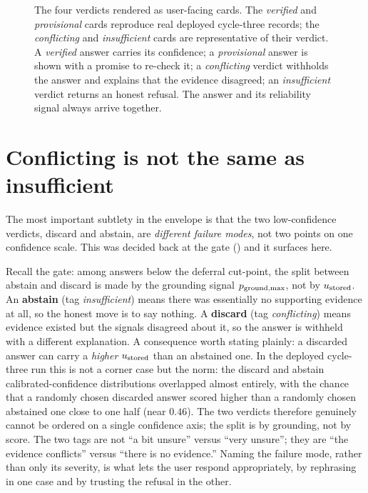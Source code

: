 \begin{figure}[htbp]
\caption[What the user actually sees]{The four verdicts rendered as user-facing cards. The
\emph{verified} and \emph{provisional} cards reproduce real deployed cycle-three records;
the \emph{conflicting} and \emph{insufficient} cards are representative of their verdict. A
\emph{verified} answer carries its
confidence; a \emph{provisional} answer is shown with a promise to re-check it; a
\emph{conflicting} verdict withholds the answer and explains that the evidence disagreed;
an \emph{insufficient} verdict returns an honest refusal. The answer and its reliability
signal always arrive together.}
\label{fig:cards}
\end{figure}

\section{Conflicting is not the same as insufficient}
\label{sec:output-failure-modes}

The most important subtlety in the envelope is that the two low-confidence verdicts,
discard and abstain, are \emph{different failure modes}, not two points on one
confidence scale. This was decided back at the gate () and it
surfaces here.

\begin{precise}
Recall the gate: among answers below the deferral cut-point, the split between abstain
and discard is made by the grounding signal $p_{\text{ground,max}}$, not by $u_{\text{stored}}$. An
\textbf{abstain} (tag \emph{insufficient}) means there was essentially no supporting
evidence at all, so the honest move is to say nothing. A \textbf{discard} (tag
\emph{conflicting}) means evidence existed but the signals disagreed about it, so the
answer is withheld with a different explanation. A consequence worth stating plainly:
a discarded answer can carry a \emph{higher} $u_{\text{stored}}$ than an abstained one. In the
deployed cycle-three run this is not a corner case but the norm: the discard and abstain
calibrated-confidence distributions overlapped almost entirely, with the chance that a
randomly chosen discarded answer scored higher than a randomly chosen abstained one close
to one half (near $0.46$). The two verdicts therefore genuinely cannot be ordered on a
single confidence axis; the split is by grounding, not by score. The two
tags are not ``a bit unsure'' versus ``very unsure''; they are ``the evidence
conflicts'' versus ``there is no evidence.'' Naming the failure mode, rather than only
its severity, is what lets the user respond appropriately, by rephrasing in one case
and by trusting the refusal in the other.
\end{precise}

